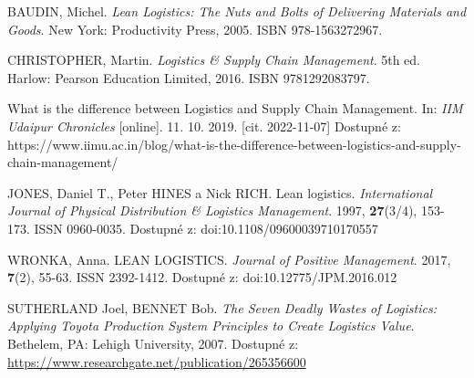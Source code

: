 



\begin{thebibliography}{1}

BAUDIN, Michel. \textit{Lean Logistics: The Nuts and Bolts of Delivering Materials and Goods}. New York: Productivity Press, 2005. ISBN 978-1563272967.

CHRISTOPHER, Martin. \textit{Logistics \& Supply Chain Management}. 5th ed. Harlow: Pearson Education Limited, 2016. ISBN 9781292083797.

What is the difference between Logistics and Supply Chain Management. In: \textit{IIM Udaipur Chronicles} [online]. 11. 10. 2019. [cit. 2022-11-07] Dostupné z: https://www.iimu.ac.in/blog/what-is-the-difference-between-logistics-and-supply-chain-management/

JONES, Daniel T., Peter HINES a Nick RICH. Lean logistics. \textit{International Journal of Physical Distribution \& Logistics Management}. 1997, \textbf{27}(3/4), 153-173. ISSN 0960-0035. Dostupné z: doi:10.1108/09600039710170557

WRONKA, Anna. LEAN LOGISTICS. \textit{Journal of Positive Management}. 2017, \textbf{7}(2), 55-63. ISSN 2392-1412. Dostupné z: doi:10.12775/JPM.2016.012

SUTHERLAND Joel, BENNET Bob. \textit{The Seven Deadly Wastes of Logistics: Applying Toyota Production System Principles to Create Logistics Value}. Bethelem, PA: Lehigh University, 2007. Dostupné z: \url{https://www.researchgate.net/publication/265356600}




\end{thebibliography}
	

	
	
